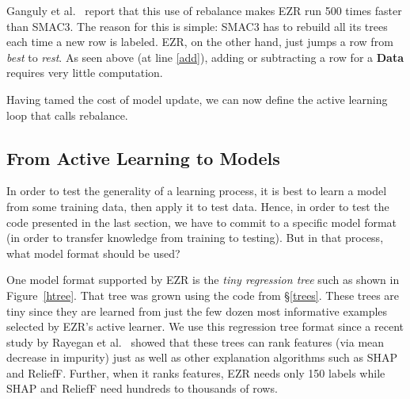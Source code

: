 \documentclass[AMA,STIX2COL]{WileyNJDv5}
\newcommand{\cls}[1]{%
  \setlength{\fboxsep}{1.5pt}%
  \colorbox{clsbg}{\sffamily\bfseries{#1}}%
}
\begin{document}
Ganguly et al.~\cite{ganguly2026lowgodatalightse} report that this use of \textsf{rebalance}
makes EZR run
 500 times faster than SMAC3.  
The reason for this is simple: 
 SMAC3 has to rebuild
all its trees each time a new row is labeled.
EZR, on the other hand, just jumps a row from
{\em best} to {\em rest}.
As seen above (at line \ref{add}), adding or subtracting a row for a \cls{Data} requires very little computation.  

Having tamed the cost of model update, we can now define the active learning loop that calls
\textsf{rebalance}.

 \subsection{ From Active Learning to Models}
In order to test the generality
 of a learning process,
 it is best to learn a model
 from some training data, then apply it to
 test data.
 Hence, in order to test the code presented
 in the last section,
 we have to commit
 to a specific  model format (in order to transfer knowledge from   training to testing). But in that process, what model format should be used?







 One model format supported by EZR is the {\em tiny regression tree}
 such as shown in 
Figure~\ref{htree}.
That tree was grown using the code from \S\ref{trees}.
These trees are tiny since they are learned   from just the few dozen most
informative examples selected by EZR's active learner.
We use this regression tree format since a recent study by
 Rayegan et al.~\cite{Amiraliminimaldata} showed that these trees can rank features   (via mean decrease in impurity) just as well as other explanation
 algorithms such as  SHAP and ReliefF. Further, when it ranks features,
 EZR needs only  150 labels while SHAP and ReliefF need
 hundreds to thousands of rows.
 
\end{document}
